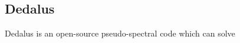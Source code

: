 {\color{purple}    
\subsection{Dedalus}}

Dedalus is an open-source pseudo-spectral code which can solve  
